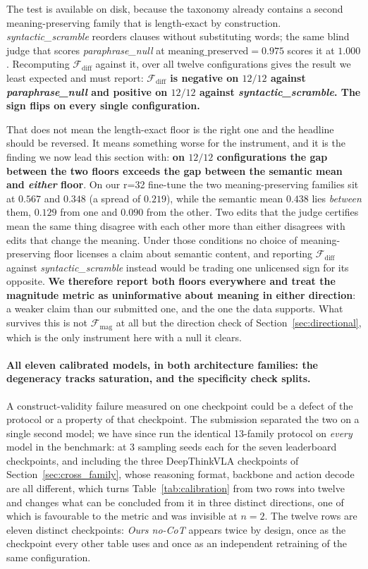\documentclass{article}
\begin{document}
The test is available on disk, because the taxonomy already contains a second meaning-preserving family that is length-exact by construction. \emph{syntactic\_scramble} reorders clauses without substituting words; the same blind judge that scores \emph{paraphrase\_null} at $\text{meaning\_preserved}=0.975$ scores it at $1.000$. Recomputing $\mathcal{F}_{\text{diff}}$ against it, over all twelve configurations gives the result we least expected and must report: \textbf{$\mathcal{F}_{\text{diff}}$ is negative on $12/12$ against \emph{paraphrase\_null} and positive on $12/12$ against \emph{syntactic\_scramble}. The sign flips on every single configuration.}

That does not mean the length-exact floor is the right one and the headline should be reversed. It means something worse for the instrument, and it is the finding we now lead this section with: \textbf{on $12/12$ configurations the gap between the two floors exceeds the gap between the semantic mean and \emph{either} floor}. On our r=32 fine-tune the two meaning-preserving families sit at $0.567$ and $0.348$ (a spread of $0.219$), while the semantic mean $0.438$ lies \emph{between} them, $0.129$ from one and $0.090$ from the other. Two edits that the judge certifies mean the same thing disagree with each other more than either disagrees with edits that change the meaning. Under those conditions no choice of meaning-preserving floor licenses a claim about semantic content, and reporting $\mathcal{F}_{\text{diff}}$ against \emph{syntactic\_scramble} instead would be trading one unlicensed sign for its opposite. \textbf{We therefore report both floors everywhere and treat the magnitude metric as uninformative about meaning in either direction}: a weaker claim than our submitted one, and the one the data supports. What survives this is not $\mathcal{F}_{\text{mag}}$ at all but the direction check of Section~\ref{sec:directional}, which is the only instrument here with a null it clears.

\paragraph{All eleven calibrated models, in both architecture families: the degeneracy tracks saturation, and the specificity check splits.} A construct-validity failure measured on one checkpoint could be a defect of the protocol or a property of that checkpoint. The submission separated the two on a single second model; we have since run the identical 13-family protocol on \emph{every} model in the benchmark: at 3 sampling seeds each for the seven leaderboard checkpoints, and including the three DeepThinkVLA checkpoints of Section~\ref{sec:cross_family}, whose reasoning format, backbone and action decode are all different, which turns Table~\ref{tab:calibration} from two rows into twelve and changes what can be concluded from it in three distinct directions, one of which is favourable to the metric and was invisible at $n{=}2$. The twelve rows are eleven distinct checkpoints: \emph{Ours no-CoT} appears twice by design, once as the checkpoint every other table uses and once as an independent retraining of the same configuration.
\end{document}
